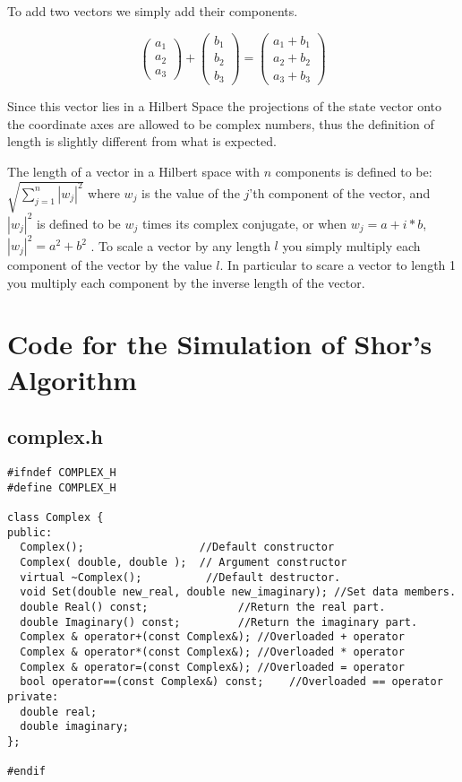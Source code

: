 \documentclass[]{article}
\begin{document}
	To add two vectors we simply add their components.

\[\left( \begin{array}{l} 
	a_{1} \\
	a_{2} \\ 
	a_{3} 
	\end{array} 
\right) +
\left( \begin{array}{c} 
	b_{1} \\ b_{2} \\ b_{3} \end{array} \right) =
\left( \begin{array}{r} a_{1}+b_{1} \\ a_{2}+b_{2} \\ a_{3}+b_{3} \end{array} \right)\]

	Since this vector lies in a Hilbert Space the projections of
the state vector onto the coordinate axes are allowed to be complex
numbers, thus the definition of length is slightly different from what
is expected.

	The length of a vector in a Hilbert space with $n$ components
is defined to be: $\sqrt{\sum_{j = 1}^{n}|w_{j}|^{2}}$ where $w_{j}$
is the value of the $j$'th component of the vector, and $|w_{j}|^{2}$
is defined to be $w_{j}$ times its complex conjugate, or when $w_{j} =
a + i * b$, $|w_{j}|^{2} = a^{2} + b^{2}$
.
	To scale a vector by any length $l$ you simply multiply each
component of the vector by the value $l$.  In particular to scare a
vector to length 1 you multiply each component by the inverse length
of the vector.

\section{Code for the Simulation of Shor's Algorithm}

\subsection{complex.h}
\begin{verbatim}
#ifndef COMPLEX_H
#define COMPLEX_H

class Complex {
public:
  Complex();                  //Default constructor
  Complex( double, double );  // Argument constructor
  virtual ~Complex();          //Default destructor.
  void Set(double new_real, double new_imaginary); //Set data members.
  double Real() const;              //Return the real part.
  double Imaginary() const;         //Return the imaginary part.
  Complex & operator+(const Complex&); //Overloaded + operator
  Complex & operator*(const Complex&); //Overloaded * operator
  Complex & operator=(const Complex&); //Overloaded = operator
  bool operator==(const Complex&) const;    //Overloaded == operator
private:
  double real;
  double imaginary;
};

#endif
\end{verbatim}
\end{document}
